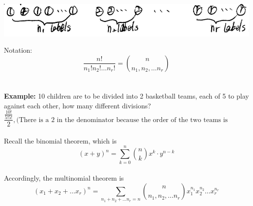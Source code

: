 \documentclass[11pt, letterpaper]{article}
\begin{document}
\includegraphics[scale=0.7]{1-5} \\

\vspace{0.2cm}

Notation: \begin{equation*}\frac{n!}{n_1!n_2!\dots n_r!} = \binom{n}{n_1,n_2,\dots n_r}\end{equation*} \\ \\
\noindent
\textbf{Example:} 10 children are to be divided into 2 basketball teams, each of 5 to play against each other, how many different divisions? \\
\begin{equation*}
  \frac{\frac{10!}{5!5!}}{2}, \text{(There is a 2 in the denominator because the order of the two teams is irrelevant.)}
\end{equation*} \\
Recall the binomial theorem, which is \begin{equation*}
  (x+y)^n = \sum_{k=0}^n \binom{n}{k} x^k \cdot y^{n-k}
\end{equation*} \\
Accordingly, the multinomial theorem is \begin{equation*}
  (x_1+x_2+\dots x_r)^n = \sum_{n_1+n_2+\dots n_r = n}\binom{n}{n_1,n_2,\dots n_r}x_1^{n_1} x_2^{n_2} \dots x_r^{n_r}
\end{equation*}
\end{document}
